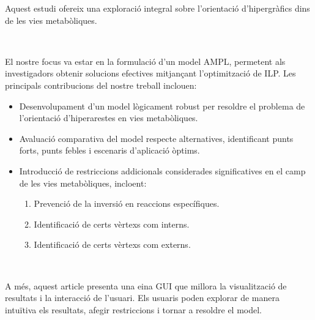 Aquest estudi ofereix una exploració integral sobre l'orientació d'hipergràfics dins de les vies metabòliques.

~

El nostre focus va estar en la formulació d'un model AMPL, permetent als investigadors obtenir solucions efectives mitjançant l'optimització de ILP. Les principals contribucions del nostre treball inclouen:

\begin{itemize}
\item Desenvolupament d'un model lògicament robust per resoldre el problema de l'orientació d'hiperarestes en vies metabòliques.
\item Avaluació comparativa del model respecte alternatives, identificant punts forts, punts febles i escenaris d'aplicació òptims.
\item Introducció de restriccions addicionals considerades significatives en el camp de les vies metabòliques, incloent:
\begin{enumerate}[left=2em]
\item Prevenció de la inversió en reaccions específiques.
\item Identificació de certs vèrtexs com interns.
\item Identificació de certs vèrtexs com externs.
\end{enumerate}
\end{itemize}

~

A més, aquest article presenta una eina GUI que millora la visualització de resultats i la interacció de l'usuari. Els usuaris poden explorar de manera intuïtiva els resultats, afegir restriccions i tornar a resoldre el model.
